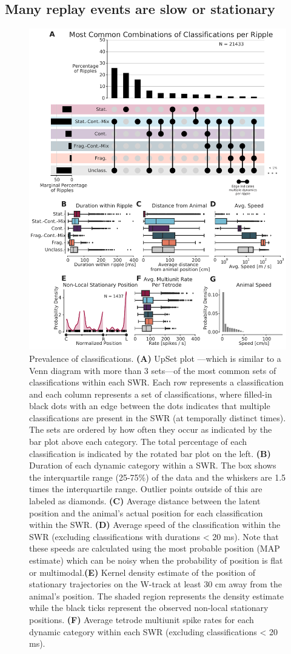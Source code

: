 \documentclass[9pt,lineno]{elife}
\begin{document}
\subsection*{Many replay events are slow or stationary}

\begin{figure}
\includegraphics[width=0.80\linewidth]{figures/Figure5/Figure5_v6}
\caption{
Prevalence of classifications. \textbf{(A)} UpSet plot \citep{LexUpSetVisualizationIntersecting2014}---which is similar to a Venn diagram with more than 3 sets---of the most common sets of classifications within each SWR. Each row represents a classification and each column represents a set of classifications, where filled-in black dots with an edge between the dots indicates that multiple classifications are present in the SWR (at temporally distinct times). The sets are ordered by how often they occur as indicated by the bar plot above each category. The total percentage of each classification is indicated by the rotated bar plot on the left. \textbf{(B)} Duration of each dynamic category within a SWR. The box shows the interquartile range (25-75\%) of the data and the whiskers are 1.5 times the interquartile range. Outlier points outside of this are labeled as diamonds. \textbf{(C)} Average distance between the latent position and the animal's actual position for each classification within the SWR. \textbf{(D)} Average speed of the classification within the SWR (excluding classifications with durations < 20 ms). Note that these speeds are calculated using the most probable position (MAP estimate) which can be noisy when the probability of position is flat or multimodal.\textbf{(E)} Kernel density estimate of the position of stationary trajectories on the W-track at least 30 cm away from the animal's position. The shaded region represents the density estimate while the black ticks represent the observed non-local stationary positions. \textbf{(F)} Average tetrode multiunit spike rates for each dynamic category within each SWR (excluding classifications < 20 ms).
}
\label{fig:5}


\end{figure}
\end{document}
